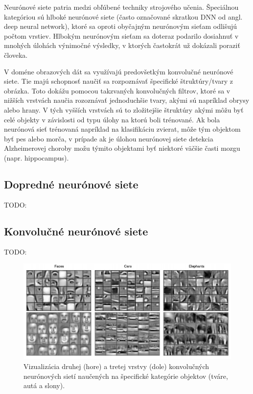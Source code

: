 Neurónové siete patria medzi obľúbené techniky strojového učenia. Špeciálnou kategóriou sú hlboké neurónové siete (často označované skratkou DNN od angl. deep neural network), ktoré sa oproti obyčajným neurónovým sieťam odlišujú počtom vrstiev. Hlbokým neurónovým sieťam sa doteraz podarilo dosiahnuť v mnohých úlohách výnimočné výsledky, v ktorých častokrát už dokázali poraziť človeka. %

V doméne obrazových dát sa využívajú predovšetkým konvolučné neurónové siete. Tie majú schopnosť naučiť sa rozpoznávať špecifické štruktúry/tvary z obrázka. Toto dokážu pomocou takzvaných konvolučných filtrov, ktoré sa v nižších vrstvách naučia rozoznávať jednoduchšie tvary, akými sú napríklad obrysy alebo hrany. V tých vyšších vrstvách sú to zložitejšie štruktúry akými môžu byť celé objekty v závislosti od typu úlohy na ktorú boli trénované. Ak bola neurónová sieť trénovaná napríklad na klasifikáciu zvierat, môže tým objektom byť pes alebo morča, v prípade ak je úlohou neurónovej siete detekcia Alzheimerovej choroby možu týmito objektami byť niektoré väčšie časti mozgu (napr. hippocampus).

\subsection{Dopredné neurónové siete}

TODO:

\subsection{Konvolučné neurónové siete}

TODO:

\begin{figure}[h!]
\centering
\includegraphics[scale=0.5]{assets/images/cnn.png}
\caption{
    Vizualizácia druhej (hore) a tretej vrstvy (dole) konvolučných neurónových sietí naučených na špecifické kategórie objektov (tváre, autá a slony). \cite{Lee_Grosse_Ranganath_Ng}
}
\label{fig:cnn}
\end{figure}

